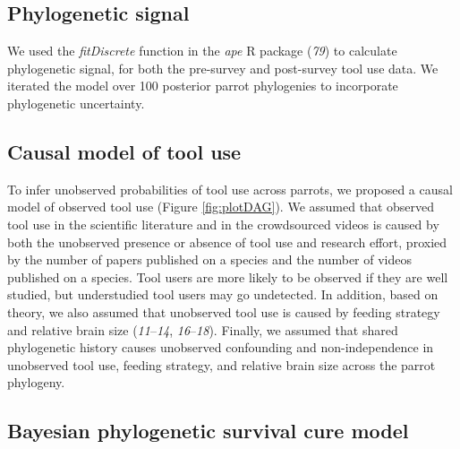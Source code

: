 \documentclass[
  man,floatsintext]{apa6}
\begin{document}
\hypertarget{phylogenetic-signal}{%
\subsection{Phylogenetic signal}\label{phylogenetic-signal}}

We used the \emph{fitDiscrete} function in the \emph{ape} R package (\emph{79}) to
calculate phylogenetic signal, for both the pre-survey and post-survey tool use
data. We iterated the model over 100 posterior parrot phylogenies to incorporate
phylogenetic uncertainty.

\hypertarget{causal-model-of-tool-use}{%
\subsection{Causal model of tool use}\label{causal-model-of-tool-use}}

To infer unobserved probabilities of tool use across parrots, we proposed a
causal model of observed tool use (Figure \ref{fig:plotDAG}). We assumed that
observed tool use in the scientific literature and in the crowdsourced videos is
caused by both the unobserved presence or absence of tool use and research
effort, proxied by the number of papers published on a species and the number of
videos published on a species. Tool users are more likely to be observed if they
are well studied, but understudied tool users may go undetected. In addition,
based on theory, we also assumed that unobserved tool use is caused by feeding
strategy and relative brain size (\emph{11}--\emph{14}, \emph{16}--\emph{18}). Finally, we
assumed that shared phylogenetic history causes unobserved confounding and
non-independence in unobserved tool use, feeding strategy, and relative brain
size across the parrot phylogeny.

\hypertarget{bayesian-phylogenetic-survival-cure-model}{%
\subsection{Bayesian phylogenetic survival cure model}\label{bayesian-phylogenetic-survival-cure-model}}
\end{document}
